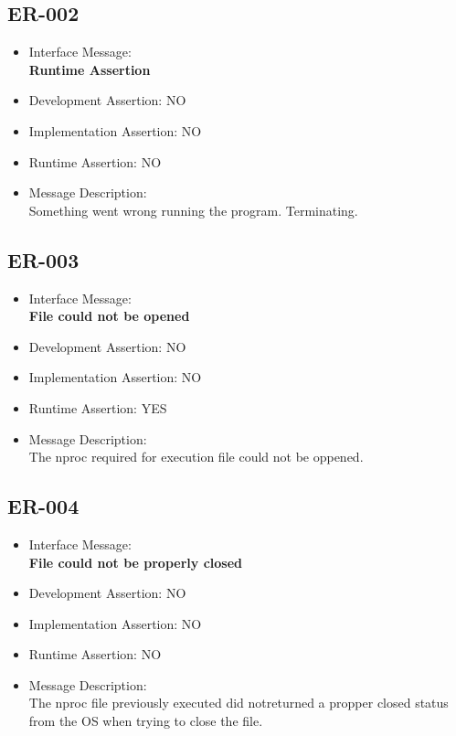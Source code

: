 \subsection{ER-002}
\begin{itemize}
  \item Interface Message:\\[1em]
    \textbf{Runtime Assertion}
  \item Development Assertion: NO
  \item Implementation Assertion: NO
  \item Runtime Assertion: NO
  \item Message Description:\\[1em]
    Something went wrong running the program. Terminating.
\end{itemize}

\subsection{ER-003}
\begin{itemize}
  \item Interface Message:\\[1em]
    \textbf{File could not be opened}
  \item Development Assertion: NO
  \item Implementation Assertion: NO
  \item Runtime Assertion: YES
  \item Message Description:\\[1em]
    The nproc required for execution file could not be oppened.
\end{itemize}

\subsection{ER-004}
\begin{itemize}
  \item Interface Message:\\[1em]
    \textbf{File could not be properly closed}
  \item Development Assertion: NO
  \item Implementation Assertion: NO
  \item Runtime Assertion: NO
  \item Message Description:\\[1em]
    The nproc file previously executed did notreturned a propper closed status from the OS when trying to close the file.
\end{itemize}

